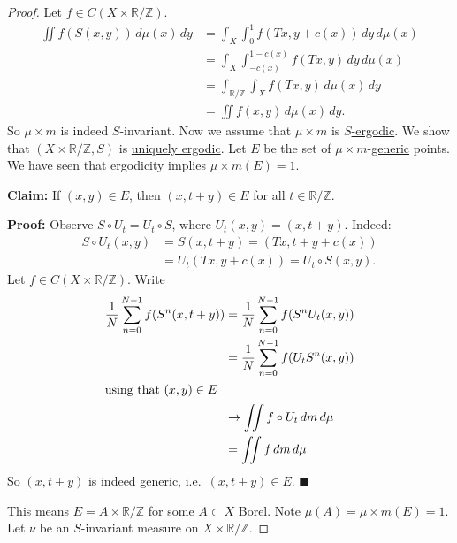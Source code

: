 \documentclass{article}
\begin{document}
\begin{proof}
  Let $f \in C(X \times \mathbb{R}/\mathbb{Z})$.
  \begin{align*}
    \iint f(S(x,y))\,d\mu(x)\, dy&=\int_X \int_0^1 f(Tx,y+c(x))\,dy\,d\mu(x)\\
                                 &=\int_X \int_{-c(x)}^{1-c(x)} f(Tx,y) \,dy\,d\mu(x) \\
                                 &=\int_{\mathbb{R}/\mathbb{Z}}\int_X f(Tx,y)\,d\mu(x)\,dy\\
                                 &=\iint f(x,y)\,d\mu(x)\,dy.
  \end{align*}
  So $\mu \times m$ is indeed $S$-invariant.
  Now we assume that $\mu \times m$ is \hyperlink{def:ergodic}{$S$-ergodic}.
  We show that $(X \times \mathbb{R}/\mathbb{Z},S)$ is \hyperlink{def:uerg}{uniquely ergodic}.
  Let $E$ be the set of $\mu\times m$-\hyperlink{def:generic}{generic} points.
  We have seen that ergodicity implies $\mu \times m(E) = 1$.

  \textbf{Claim:} If $(x,y) \in E$, then $(x, t+y) \in E$ for all $t \in \mathbb{R}/\mathbb{Z}$.

  \textbf{Proof:} Observe $S \circ U_t = U_t \circ S$, where $U_t(x,y) = (x, t+y)$.
  Indeed:
  \begin{align*}
    S \circ U_t(x,y) &= S(x, t+y) = (Tx, t+y+c(x)) \\
                     &= U_t(Tx, y + c(x)) = U_t \circ S(x,y).
  \end{align*}
  Let $f \in C(X \times \mathbb{R}/\mathbb{Z})$. Write
  \begin{align*}
    \frac{1}{N} \sum_{n=0}^{N-1} f(S^n(x,t+y)) &= \frac{1}{N} \sum_{n=0}^{N-1} f(S^n U_t (x,y)) \\
                                               &= \frac{1}{N} \sum_{n=0}^{N-1} f(U_t S^n (x,y)) \\
                                               \shortintertext{using that $(x,y) \in E$}
                                               &\to \iint f \circ U_t\,dm\,d\mu \\
                                               &= \iint f\,dm\,d\mu
  \end{align*}
  So $(x,t+y)$ is indeed generic, i.e.\ $(x,t+y) \in E$. $\blacksquare$

  This means $E = A \times \mathbb{R}/\mathbb{Z}$ for some $A \subset X$ Borel.
  Note $\mu(A) = \mu \times m(E) = 1$. Let $\nu$ be an $S$-invariant measure on $X \times \mathbb{R}/\mathbb{Z}$.


\end{proof}
\end{document}

